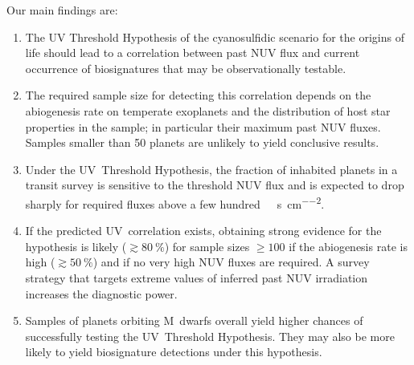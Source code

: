 \documentclass[twocolumn,twocolappendix,linenumbers]{aastex631}
\begin{document}
Our main findings are:
\begin{enumerate}
    \item The UV Threshold Hypothesis of the cyanosulfidic scenario for the origins of life should lead to a correlation between past \gls{NUV} flux and current occurrence of biosignatures that may be observationally testable.
    \item The required sample size for detecting this correlation depends on the abiogenesis rate on temperate exoplanets and the distribution of host star properties in the sample; in particular their maximum past \gls{NUV} fluxes.
    Samples smaller than 50 planets are unlikely to yield conclusive results.
    \item Under the UV~Threshold Hypothesis, the fraction of inhabited planets in a transit survey is sensitive to the threshold \gls{NUV} flux and is expected to drop sharply for required fluxes above a few hundred~\SI{}{\erg\per\second\per\centi\meter\squared}.
    \item If the predicted \gls{UV}~correlation exists, obtaining strong evidence for the hypothesis is likely ($\gtrsim \SI{80}{\percent}$) for sample sizes $\geq 100$ if the abiogenesis rate is high ($\gtrsim \SI{50}{\percent}$) and if no very high \gls{NUV} fluxes are required.
    A survey strategy that targets extreme values of inferred past \gls{NUV} irradiation increases the diagnostic power.
    \item Samples of planets orbiting M~dwarfs overall yield higher chances of successfully testing the UV~Threshold Hypothesis.
          They may also be more likely to yield biosignature detections under this hypothesis.


\end{enumerate}
\end{document}
